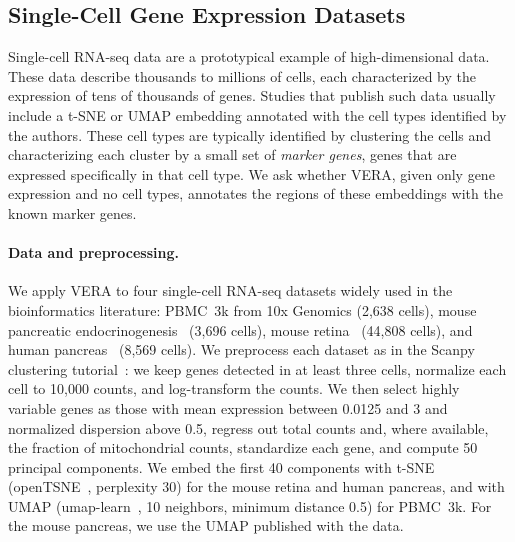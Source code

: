 \documentclass[10pt]{article}
\begin{document}
\subsection{Single-Cell Gene Expression Datasets}
\label{sec:supp-single-cell}

Single-cell RNA-seq data are a prototypical example of high-dimensional data. These data describe thousands to millions of cells, each characterized by the expression of tens of thousands of genes. 
Studies that publish such data usually include a t-SNE or UMAP embedding annotated with the cell types identified by the authors.
These cell types are typically identified by clustering the cells and characterizing each cluster by a small set of \textit{marker genes}, genes that are expressed specifically in that cell type.
We ask whether VERA, given only gene expression and no cell types, annotates the regions of these embeddings with the known marker genes.

\paragraph{Data and preprocessing.}
We apply VERA to four single-cell RNA-seq datasets widely used in the bioinformatics literature: PBMC~3k from 10x Genomics (2,638 cells), mouse pancreatic endocrinogenesis~\cite{BastidasPonce2019} (3,696 cells), mouse retina~\cite{Macosko2015} (44,808 cells), and human pancreas~\cite{Baron2016} (8,569 cells). We preprocess each dataset as in the Scanpy clustering tutorial~\cite{Wolf2018}: we keep genes detected in at least three cells, normalize each cell to 10,000 counts, and log-transform the counts. We then select highly variable genes as those with mean expression between 0.0125 and 3 and normalized dispersion above 0.5, regress out total counts and, where available, the fraction of mitochondrial counts, standardize each gene, and compute 50 principal components. We embed the first 40 components with t-SNE (\textsf{openTSNE}~\cite{Policar2024}, perplexity 30) for the mouse retina and human pancreas, and with UMAP (\textsf{umap-learn}~\cite{McInnes2018}, 10 neighbors, minimum distance 0.5) for PBMC~3k. For the mouse pancreas, we use the UMAP published with the data.
\end{document}

